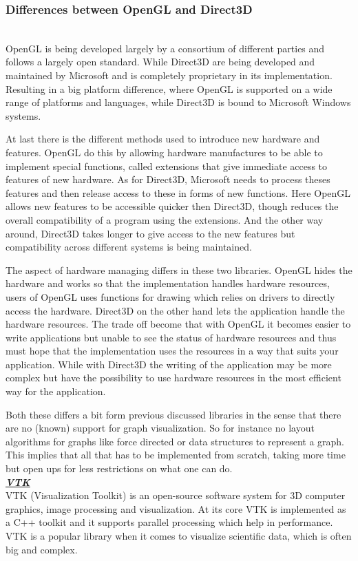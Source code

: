 \documentclass[a4paper,11pt]{kth-mag}
\begin{document}
\begin{appendices}
\subsubsection{Differences between OpenGL and Direct3D}\\
\newline
OpenGL is being developed largely by a consortium of different parties and follows a largely open standard. While Direct3D are being developed 
and maintained by Microsoft and is completely proprietary in its implementation. Resulting in a big platform difference, where OpenGL is supported on a wide range of platforms and languages,
while Direct3D is bound to Microsoft Windows systems. 

At last there is the different methods used to introduce new hardware and features. OpenGL do this by allowing hardware manufactures 
to be able to implement special functions, called extensions that give immediate access to features of new hardware. As for Direct3D,  Microsoft needs to process theses features and then release 
access to these in forms of new functions. Here OpenGL allows new features to be accessible quicker then Direct3D, though reduces the overall compatibility of a program using the extensions. 
And the other way around, Direct3D takes longer to give access to the new features but compatibility across different systems is being maintained.

The aspect of hardware managing differs in these two libraries.
OpenGL hides the hardware and works so that the implementation handles hardware resources, users of OpenGL uses functions for drawing which relies on drivers to directly access the hardware. Direct3D on
the other hand lets the application handle the hardware resources. The trade off become that with OpenGL it becomes easier to write applications but unable to see the status of hardware resources and
thus must hope that the implementation uses the resources in a way that suits your application. While with Direct3D the writing of the application may be more complex but have the possibility to use 
hardware resources in the most efficient way for the application.\cite{website:wisegeek}

Both these differs a bit form previous discussed libraries in the sense that there are no (known) support for graph visualization. 
So for instance no layout algorithms for graphs like force directed or data structures to represent a graph. This implies that all that has to be implemented from scratch, taking more time but open
ups for less restrictions on what one can do.\\
\newline
\textbf{\textit{\underline{VTK}}}\\
\newline
VTK (Visualization Toolkit)\cite{website:vtk} is an open-source software system for 3D computer graphics, image processing and visualization. At its core VTK is implemented as a C++ toolkit and it supports parallel
 processing which help in performance. VTK is a popular library when it comes to visualize scientific data, which is often big and complex. 
 

\end{appendices}
\end{document}
